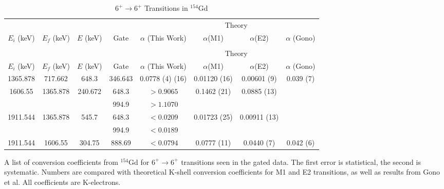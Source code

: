 \begin{sidewaystable}
    \small
    \begin{longtable}{c|c|c|c|c|c|c|c}
        \caption{$6^+\rightarrow 6^+$ Transitions in $^{154}$Gd}
        \label{tab:154Gd_6_to_6}\\
        \toprule
        &	& 	&  &	& \multicolumn{2}{c|}{Theory}	& 	\\ 
        $E_i$ (keV)	&	$E_f$ (keV)	& $E$ (keV)	&	Gate &		$\alpha$ (This Work)	& $\alpha$(M1) & $\alpha$(E2) &	$\alpha$ (Gono)	\\
        \hline
        \endfirsthead
        \toprule
        \caption[]{$6^+\rightarrow 6^+$ Transitions in $^{154}$Gd}\\
        &	& 	&  &	& \multicolumn{2}{c|}{Theory}	& 	\\ 
        $E_i$ (keV)	&	$E_f$ (keV)	& $E$ (keV)	&	Gate &		$\alpha$ (This Work)	& $\alpha$(M1) & $\alpha$(E2) &	$\alpha$ (Gono)	\\
        \hline
    	\endhead
        1365.878 & 717.662 & 648.3 & 346.643 & 0.0778 (4) (16) & 0.01120 (16) & 0.00601 (9) & 0.039 (7)\\ \hline
        1606.55 & 1365.878 & 240.672 & 648.3 & $>0.9065$ & 0.1462 (21) & 0.0885 (13) &  \\
        &  &  & 994.9 & $>1.1070$ & & &  \\ \hline
        1911.544 & 1365.878 & 545.7 & 648.3 &  $<0.0209$ & 0.01723 (25) & 0.00911 (13) &   \\
        &  &  & 994.9 &  $<0.0189$ &  & &  \\ \hline
        1911.544 & 1606.55 & 304.75 & 888.69 & $<0.0794$ & 0.0777 (11) & 0.0440 (7) & 0.042 (6) \\
        \bottomrule
    \end{longtable}
    \item{A list of conversion coefficients from $^{154}$Gd for $6^+\rightarrow 6^+$ transitions seen in the gated data. The first error is statistical, the second is systematic. Numbers are compared with theoretical K-shell conversion coefficients for M1 and E2 transitions, as well as results from Gono et al.\citep{gono74:_154gd_e0} All coefficients are K-electrons.}
\end{sidewaystable}